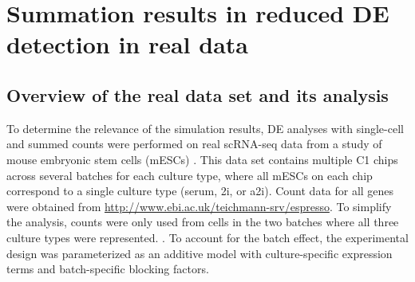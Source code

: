 \documentclass[oupdraft]{bio}
\begin{document}
\section{Summation results in reduced DE detection in real data}

\subsection{Overview of the real data set and its analysis}
To determine the relevance of the simulation results, DE analyses with single-cell and summed counts were performed on real scRNA-seq data from a study of mouse embryonic stem cells (mESCs)  \citep{kolod2015single}.
This data set contains multiple C1 chips across several batches for each culture type, where all mESCs on each chip correspond to a single culture type (serum, 2i, or a2i). 
Count data for all genes were obtained from \url{http://www.ebi.ac.uk/teichmann-srv/espresso}.
To simplify the analysis, counts were only used from cells in the two batches where all three culture types were represented.
.
To account for the batch effect, the experimental design was parameterized as an additive model with culture-specific expression terms and batch-specific blocking factors.


\end{document}
